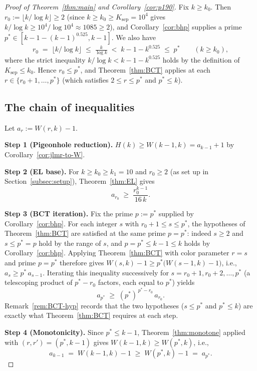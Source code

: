 \documentclass[11pt,reqno,a4paper]{amsart}
\theoremstyle{plain}
\theoremstyle{definition}
\theoremstyle{remark}
\numberwithin{equation}{section}
\begin{document}
\begin{proof}[Proof of Theorem~\ref{thm:main} and Corollary~\ref{cor:p190}]
\medskip
Fix $k\ge k_{0}$. Then $r_{0}:=\lfloor k/\log k\rfloor\ge 2$ (since
$k\ge k_{0}\ge K_{\mathrm{sep}}=10^{4}$ gives
$k/\log k\ge 10^{4}/\log 10^{4}\approx 1085\ge 2$), and
Corollary~\ref{cor:bhp} supplies a prime
$p^{*}\in[k-1-(k-1)^{0.525},k-1]$. We also have
\[
r_{0}\;=\;\lfloor k/\log k\rfloor\;\le\;\tfrac{k}{\log k}
\;<\;k-1-k^{0.525}\;\le\;p^{*}
\qquad(k\ge k_{0}),
\]
where the strict inequality $k/\log k<k-1-k^{0.525}$ holds by the
definition of $K_{\mathrm{sep}}\le k_{0}$. Hence $r_{0}\le p^{*}$,
and Theorem~\ref{thm:BCT} applies at each
$r\in\{r_{0}+1,\ldots,p^{*}\}$ (which satisfies $2\le r\le p^{*}$
and $p^{*}\le k$).

\subsection{The chain of inequalities}
\label{subsec:chain}

Let $a_{r}:=W(r,k)-1$.

\smallskip
\noindent\textbf{Step 1 (Pigeonhole reduction).}
$H(k)\ge W(k-1,k)=a_{k-1}+1$ by Corollary~\ref{cor:jlmr-to-W}.

\smallskip
\noindent\textbf{Step 2 (EL base).} For $k\ge k_{0}\ge k_{1}=10$ and
$r_{0}\ge 2$ (as set up in Section~\ref{subsec:setup}),
Theorem~\ref{thm:EL} gives
\[
a_{r_{0}}\;\ge\;\frac{r_{0}^{k-1}}{16\,k}.
\]

\smallskip
\noindent\textbf{Step 3 (BCT iteration).}
Fix the prime $p:=p^{*}$ supplied by Corollary~\ref{cor:bhp}. For each
integer $s$ with $r_{0}+1\le s\le p^{*}$, the hypotheses of
Theorem~\ref{thm:BCT} are satisfied at the same prime
$p=p^{*}$: indeed $s\ge 2$ and $s\le p^{*}=p$ hold by the range of
$s$, and $p=p^{*}\le k-1\le k$ holds by Corollary~\ref{cor:bhp}.
Applying Theorem~\ref{thm:BCT} with color parameter $r=s$ and prime
$p=p^{*}$ therefore gives $W(s,k)-1\ge p^{*}\bigl(W(s-1,k)-1\bigr)$,
i.e., $a_{s}\ge p^{*}\,a_{s-1}$. Iterating this inequality
successively for $s=r_{0}+1,r_{0}+2,\ldots,p^{*}$ (a telescoping
product of $p^{*}-r_{0}$ factors, each equal to $p^{*}$) yields
\begin{equation}
a_{p^{*}}\;\ge\;(p^{*})^{\,p^{*}-r_{0}}\,a_{r_{0}}.
\label{eq:chain1}
\end{equation}
Remark~\ref{rem:BCT-hyp} records that the two hypotheses
($s\le p^{*}$ and $p^{*}\le k$) are exactly what
Theorem~\ref{thm:BCT} requires at each step.

\smallskip
\noindent\textbf{Step 4 (Monotonicity).}
Since $p^{*}\le k-1$, Theorem~\ref{thm:monotone} applied with
$(r,r')=(p^{*},k-1)$ gives $W(k-1,k)\ge W(p^{*},k)$, i.e.,
\[
a_{k-1}\;=\;W(k-1,k)-1\;\ge\;W(p^{*},k)-1\;=\;a_{p^{*}}.
\]


\end{proof}
\end{document}
